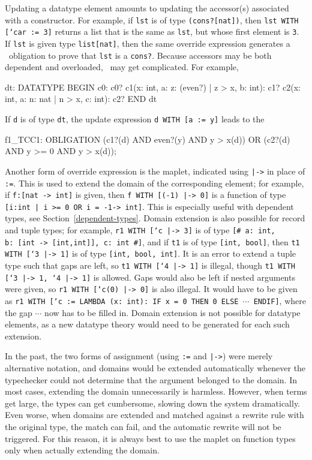 Updating a datatype element amounts to updating the accessor(s) associated
with a constructor.  For example, if \texttt{lst} is of type
\texttt{(cons?[nat])}, then \texttt{lst WITH [`car := 3]} returns a list
that is the same as \texttt{lst}, but whose first element is \texttt{3}.
If \texttt{lst} is given type \texttt{list[nat]}, then the same override
expression generates a \tcc\ obligation to prove that \texttt{lst} is a
\texttt{cons?}.  Because accessors may be both dependent and overloaded,
\tccs\ may get complicated.  For example,
\begin{pvsex}
  dt: DATATYPE
  BEGIN
   c0: c0?
   c1(x: int, a: \setb{}z: (even?) | z > x\sete, b: int): c1?
   c2(x: int, a: \setb{}n: nat | n > x\sete, c: int): c2?
  END dt
\end{pvsex}
If \texttt{d} is of type \texttt{dt}, the update expression \texttt{d WITH
[a := y]} leads to the \tcc
\begin{pvsex}
  f1_TCC1: OBLIGATION
    (c1?(d) AND even?(y) AND y > x(d)) OR
     (c2?(d) AND y >= 0 AND y > x(d));
\end{pvsex}

Another form of override expression is the maplet, indicated using
\texttt{|->} in place of \texttt{:=}.  This is used to extend the domain
of the corresponding element; for example, if \texttt{f:[nat -> int]} is
given, then \texttt{f WITH [(-1) |-> 0]} is a function of type
\texttt{[\setb{}i:int | i >= 0 OR i = -1\sete -> int]}.  This is especially useful
with dependent types, see Section~\ref{dependent-types}.  Domain extension
is also possible for record and tuple types; for example, \texttt{r1 WITH
[`c |-> 3]} is of type \texttt{[\# a:\ int, b:\ [int -> [int,int]], c:\ int
\#]}, and if \texttt{t1} is of type \texttt{[int, bool]}, then \texttt{t1
WITH [`3 |-> 1]} is of type \texttt{[int, bool, int]}.  It is an error to
extend a tuple type such that gaps are left, so \texttt{t1 WITH [`4 |->
1]} is illegal, though \texttt{t1 WITH [`3 |-> 1, `4 |-> 1]} is allowed.
Gaps would also be left if nested arguments were given, so \texttt{r1 WITH
[`c(0) |-> 0]} is also illegal.  It would have to be given as \texttt{r1
WITH [`c := LAMBDA (x:\ int):\ IF x = 0 THEN 0 ELSE $\cdots$ ENDIF]}, where
the gap $\cdots$ now has to be filled in.  Domain extension is not
possible for datatype elements, as a new datatype theory would need to be
generated for each such extension.

In the past, the two forms of assignment (using \texttt{:=} and
\texttt{|->}) were merely alternative notation, and domains would be
extended automatically whenever the typechecker could not determine that
the argument belonged to the domain.  In most cases, extending the domain
unnecessarily is harmless.  However, when terms get large, the types can
get cumbersome, slowing down the system dramatically.  Even worse, when
domains are extended and matched against a rewrite rule with the original
type, the match can fail, and the automatic rewrite will not be triggered.
For this reason, it is always best to use the maplet on function types
only when actually extending the domain.

